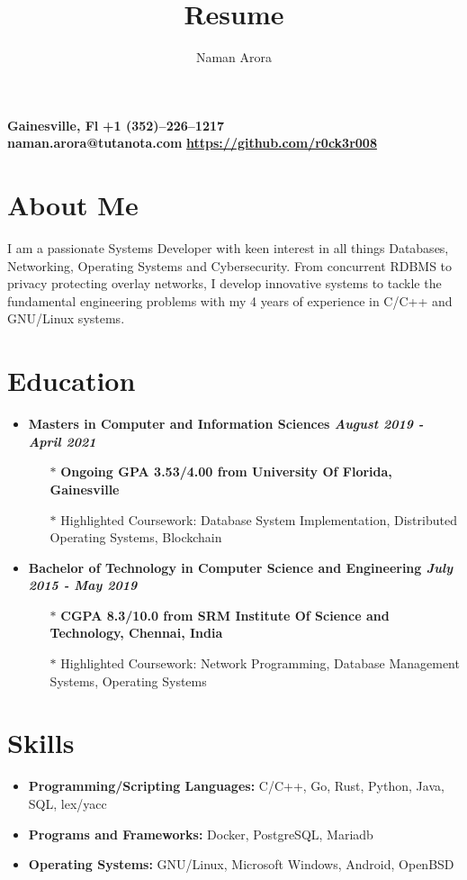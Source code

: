 \documentclass[10pt,a4paper]{article}
\makeatletter
\renewcommand{\maketitle}
{
	\begin{flushleft}
		\textbf{\Huge\theauthor}
	\end{flushleft}
	\begin{flushleft}
		\small{\textbf{{\faMapMarker} \hspace{0.2cm} Gainesville, Fl} \hspace{2.5cm} \textbf{{\faMobile} \hspace{0.2cm} +1 (352)--226--1217} \\
				\textbf{{\faEnvelope} \hspace{0.1cm} naman.arora@tutanota.com} \hspace{0.5cm}
				\textbf{{\faGithub} \hspace{0.1cm} \href{https://github.com/r0ck3r008}{https://github.com/r0ck3r008}}}
	\end{flushleft}
}
\makeatother
\begin{document}
\title{Resume}
\author{Naman Arora}
\maketitle


\section{{\faUser} About Me}
	I am a passionate Systems Developer with keen interest in all things Databases, Networking, Operating Systems and Cybersecurity. From concurrent RDBMS to privacy protecting overlay networks, I develop innovative systems to tackle the fundamental engineering problems with my 4 years of experience in C/C++ and GNU/Linux systems.

\section{{\faUniversity} Education}

\begin{itemize}[noitemsep,nolistsep]
	\item\textbf{Masters in Computer and Information Sciences \hfill \textit{August 2019 - April 2021}}
		\begin{itemize}[leftmargin=*]
			\setlength\itemsep{-0.25em}
			\item[$\ast$]\textbf{Ongoing GPA 3.53/4.00 from University Of Florida, Gainesville}
			\item[$\ast$]Highlighted Coursework: Database System Implementation, Distributed Operating Systems, Blockchain
		\end{itemize}
	\item\textbf{Bachelor of Technology in Computer Science and Engineering \hfill \textit{July 2015 - May 2019}}
		\begin{itemize}[leftmargin=*]
			\setlength\itemsep{-0.25em}
			\item[$\ast$]\textbf{CGPA 8.3/10.0 from SRM Institute Of Science and Technology, Chennai, India}
			\item[$\ast$]Highlighted Coursework: Network Programming, Database Management Systems, Operating Systems
		\end{itemize}
\end{itemize}

\section{{\faCogs} Skills}
	\begin{itemize}[noitemsep,nolistsep]
		\item\textbf{Programming/Scripting Languages:} C/C++, Go, Rust, Python, Java, SQL, lex/yacc
		\item\textbf{Programs and Frameworks:} Docker, PostgreSQL, Mariadb
		\item\textbf{Operating Systems:} GNU/Linux, Microsoft Windows, Android, OpenBSD
	\end{itemize}
\end{document}
